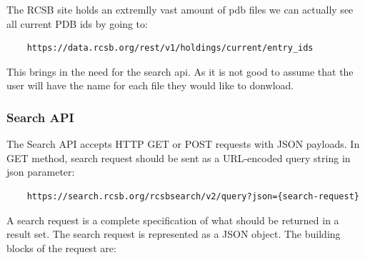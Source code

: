 \documentclass[]{final_report}
\begin{document}
The RCSB site holds an extremlly vast amount of pdb files we can actually see all current PDB ids by going to:

\begin{lstlisting}
    https://data.rcsb.org/rest/v1/holdings/current/entry_ids
\end{lstlisting}

This brings in the need for the search api. As it is not good to assume that the user will have the name for each file they would like to donwload.

\clearpage

\subsubsection{Search API}

The Search API accepts HTTP GET or POST requests with JSON payloads. In GET method, search request should be sent as a URL-encoded query string in json parameter: 

\begin{lstlisting}
    https://search.rcsb.org/rcsbsearch/v2/query?json={search-request}
\end{lstlisting}

A search request is a complete specification of what should be returned in a result set. The search request is represented as a JSON object. The building blocks of the request are:

\vspace{40px}
\end{document}
